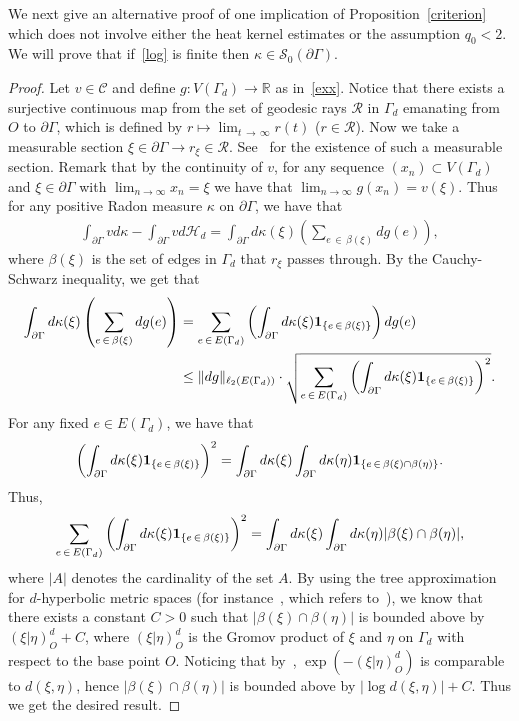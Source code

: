 \documentclass[AHL,Unicode,longabstracts,published]{cedram}
\newcommand{\cR}{\mathcal{R}}
\newcommand{\cs}{\mathcal{S}}
\newcommand{\ch}{\mathcal{H}}
\newcommand{\cC}{\mathcal{C}}
\newcommand{\br}{\mathbb{R}}
\begin{document}
We next give an alternative proof of one implication of Proposition~\ref{criterion} which does not involve either the heat kernel estimates or the assumption $q_0<2$. We will prove that if~\eqref{log} is finite then $\kappa\in \cs_0(\partial\Gamma)$.

\begin{proof}
Let $v\in\cC$ and define $g:V(\Gamma_{d})\to\br$ as in~\eqref{exx}. Notice that there exists a surjective continuous map from the set of geodesic rays $\cR$ in $\Gamma_{d}$ emanating from $O$ to $\partial\Gamma$, which is defined by $r\mapsto \lim_{t\,\to\,\infty}r(t)$ ($r\in\cR$). Now we take a measurable section $\xi\in\partial\Gamma\to r_{\xi}\in\cR$. See~\cite[Chapter~I]{Par} for the existence of such a measurable section. Remark that by the continuity of $v$, for any sequence $(x_n)\subset V(\Gamma_{d})$ and $\xi\in\partial\Gamma$ with $\lim_{n\to\infty}x_n=\xi$ we have that $\lim_{n\to\infty}g(x_n)=v(\xi)$. Thus for any positive Radon measure $\kappa$ on $\partial\Gamma$, we have that
\begin{align*}
\int_{\partial\Gamma}vd\kappa-\int_{\partial\Gamma}vd\ch_{d} =\int_{\partial\Gamma}d\kappa(\xi)\left(\sum_{e\,\in\,\beta(\xi)}dg(e)\right),
\end{align*}
where $\beta(\xi)$ is the set of edges in $\Gamma_{d}$ that $r_{\xi}$ passes through. By the Cauchy-Schwarz inequality, we get that
\begin{align*}
\int_{\partial\Gamma}d\kappa(\xi)\left(\sum_{e\,\in\,\beta(\xi)}dg(e)\right) &=\sum_{e\,\in\,E(\Gamma_{d})}\left(\int_{\partial\Gamma}d\kappa(\xi){\bf 1}_{\left\{e\,\in\,\beta(\xi)\right\}}\right)dg(e)\\
&\leq \|dg\|_{\ell_2(E(\Gamma_{d}))}\cdot
\sqrt{
\sum_{e\,\in\,E(\Gamma_{d})}\left(\int_{\partial\Gamma}d\kappa(\xi){\bf 1}_{\left\{e\,\in\,\beta(\xi)\right\}}\right)^2 }.
\end{align*}
For any fixed $e\in E(\Gamma_{d})$, we have that
\begin{align*}
\left(\int_{\partial\Gamma}d\kappa(\xi){\bf 1}_{\left\{e\,\in\,\beta(\xi)\right\}}\right)^2 =\int_{\partial\Gamma}d\kappa(\xi)\int_{\partial\Gamma}d\kappa(\eta){\bf 1}_{\left\{e\,\in\,\beta(\xi)\cap\beta(\eta)\right\}}.
\end{align*}
Thus,
\begin{align*}
\sum_{e\,\in\,E(\Gamma_{d})}\left(\int_{\partial\Gamma}d\kappa(\xi){\bf 1}_{\left\{e\,\in\,\beta(\xi)\right\}}\right)^2 =\int_{\partial\Gamma}d\kappa(\xi)\int_{\partial\Gamma}d\kappa(\eta)|\beta(\xi)\cap\beta(\eta)|,
\end{align*}
where $|A|$ denotes the cardinality of the set $A$. By using the tree approximation for $d$-hyperbolic metric spaces (for instance~\cite[Theorem~1.1]{Coo}, which refers to~\cite{Gro}), we know that there exists a constant $C>0$ such that $|\beta(\xi)\cap\beta(\eta)|$ is bounded above by $(\xi|\eta)_O^{d}+C$, where $(\xi|\eta)_O^{d}$ is the Gromov product of $\xi$ and $\eta$ on $\Gamma_{d}$ with respect to the base point $O$. Noticing that by~\cite[Proposition~2.1]{BP}, $\exp(-(\xi|\eta)^{d}_O)$ is comparable to $d(\xi,\eta)$, hence $|\beta(\xi)\cap\beta(\eta)|$ is bounded above by $|\log d(\xi,\eta)|+C$. Thus we get the desired result.
\end{proof}
\end{document}
